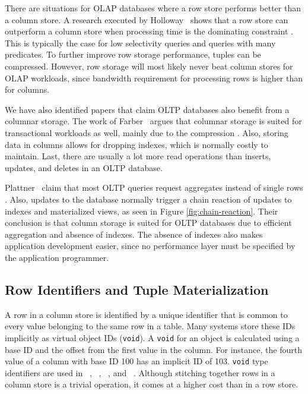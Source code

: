 There are situations for OLAP databases where a row store performs better than a column store. A research executed by Holloway \ea~shows that a row store can outperform a column store when processing time is the dominating constraint \cite{Holloway2008-rr}. This is typically the case for low selectivity queries and queries with many predicates. To further improve row storage performance, tuples can be compressed. However, row storage will most likely never beat column stores for OLAP workloads, since bandwidth requirement for processing rows is higher than for columns.

We have also identified papers that claim OLTP databases also benefit from a columnar storage. The work of Farber \ea~argues that columnar storage is suited for transactional workloads as well, mainly due to the compression \cite{Farber2012-vh}. Also, storing data in columns allows for dropping indexes, which is normally costly to maintain. Last, there are usually a lot more read operations than inserts, updates, and deletes in an OLTP database.

Plattner \ea~claim that most OLTP queries request aggregates instead of single rows \cite{Plattner2014-fr}. Also, updates to the database normally trigger a chain reaction of updates to indexes and materialized views, as seen in Figure \ref{fig:chain-reaction}. Their conclusion is that column storage is suited for OLTP databases due to efficient aggregation and absence of indexes. The absence of indexes also makes application development easier, since no performance layer must be specified by the application programmer. 

\subsection{Row Identifiers and Tuple Materialization}
\label{sub:Row Identifiers and Tuple Materialization}
A row in a column store is identified by a unique identifier that is common to every value belonging to the same row in a table. Many systems store these IDs implicitly as virtual object IDs (\texttt{void}). A \texttt{void} for an object is calculated using a base ID and the offset from the first value in the column. For instance, the fourth value of a column with base ID 100 has an implicit ID of 103. \texttt{void} type identifiers are used in \monetdb~\cite{Boncz2002-yj}, \cstore~\cite{Stonebraker2005-qz}, \vertica~\cite{Lamb2012-kg}, and \ibm~\cite{Raman2013-em}. Although stitching together rows in a column store is a trivial operation, it comes at a higher cost than in a row store.

